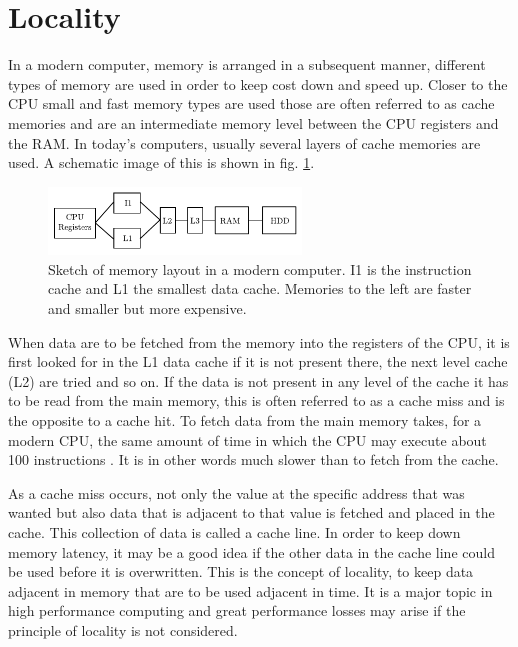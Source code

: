 \section{Locality}
In a modern computer, memory is arranged in a subsequent manner,
different types of memory are used in order to keep cost down and
speed up. Closer to the CPU small and fast memory types are used those
are often referred to as cache memories and are an intermediate memory
level between the CPU registers and the RAM. In today's computers,
usually several layers of cache memories are used. A schematic image
of this is shown in fig. \ref{fig:hpc:mem}.

\begin{figure}
\begin{center}
\includegraphics[width=0.6\textwidth]{fig/mem.pdf}
\end{center}
\caption{Sketch of memory layout in a modern computer. I1 is the
  instruction cache and L1 the smallest data cache. Memories to the
  left are faster and smaller but more expensive. }
\label{fig:hpc:mem}
\end{figure}

When data are to be fetched from the memory into the registers of the
CPU, it is first looked for in the L1 data cache if it is not present
there, the next level cache (L2) are tried and so on. If the data is
not present in any level of the cache it has to be read from the main
memory, this is often referred to as a cache miss and is the opposite
to a cache hit. To fetch data from the main memory takes, for a modern
CPU, the same amount of time in which the CPU may execute about 100
instructions \cite{wiki-mem}. It is in other words much slower than to
fetch from the cache.

As a cache miss occurs, not only the value at the specific address
that was wanted but also data that is adjacent to that value is
fetched and placed in the cache. This collection of data is called a
cache line. In order to keep down memory latency, it may be a good
idea if the other data in the cache line could be used before it is
overwritten. This is the concept of locality, to keep data adjacent in
memory that are to be used adjacent in time. It is a major topic in
high performance computing and great performance losses may arise if
the principle of locality is not considered.

